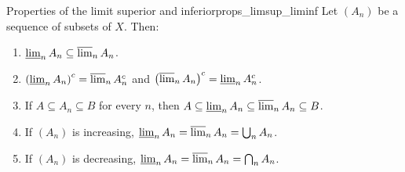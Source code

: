 \documentclass[11pt, a4paper]{article}
\begin{document}
\begin{proposicion}{Properties of the limit superior and inferior}{props_limsup_liminf}
Let $(A_n)$ be a sequence of subsets of $X$. Then:
\begin{enumerate}
    \item $\varliminf_n A_n \subseteq \varlimsup_n A_n$.
    \item $\left(\varliminf_n A_n\right)^c = \varlimsup_n A_n^c$ and
    $\left(\varlimsup_n A_n\right)^c = \varliminf_n A_n^c$.
    \item If $A \subseteq A_n \subseteq B$ for every $n$, then
    $A \subseteq \varliminf_n A_n \subseteq \varlimsup_n A_n \subseteq B$.
    \item If $(A_n)$ is increasing, $\varliminf_n A_n = \varlimsup_n A_n = \bigcup_n A_n$.
    \item If $(A_n)$ is decreasing, $\varliminf_n A_n = \varlimsup_n A_n = \bigcap_n A_n$.
\end{enumerate}
\end{proposicion}
\end{document}
